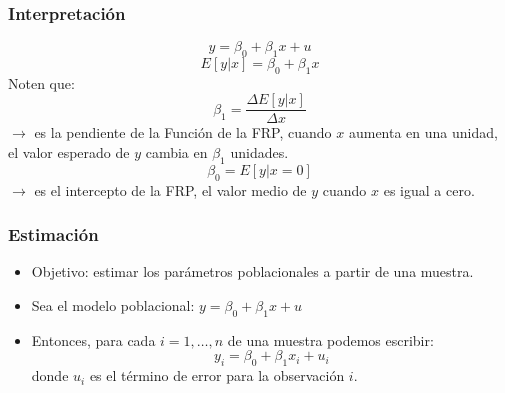 \documentclass{beamer}
\begin{document}
\begin{frame}
	\frametitle{Interpretaci\'on} %
\begin{equation*}
  y = \beta_0 + \beta_1x + u
\end{equation*}
\begin{equation*}
  E[y|x] = \beta_0 + \beta_1x
\end{equation*}
Noten que:
\begin{equation*}
  \beta_1 = \frac{\Delta E[y|x]}{\Delta x}
\end{equation*}
$\rightarrow$ es la pendiente de la Función de la FRP, cuando \(x\) aumenta en una unidad, el valor esperado de \(y\) cambia en \(\beta_1\) unidades.
\begin{equation*}
  \beta_0 = E[y|x = 0]
\end{equation*}
$\rightarrow$ es el intercepto de la FRP, el valor medio de \(y\) cuando \(x\) es igual a cero.
\end{frame}	
\begin{frame}
	\frametitle{Estimaci\'on} %
\begin{itemize}
  \item Objetivo: estimar los parámetros poblacionales a partir de una muestra.
  \item Sea el modelo poblacional: $y = \beta_0 + \beta_1x + u$
  \item Entonces, para cada $i = 1, \ldots, n$ de una muestra podemos escribir:
  \begin{equation*}
    y_i = \beta_0 + \beta_1x_i + u_i
  \end{equation*}
  donde $u_i$ es el término de error para la observación $i$.
\end{itemize}
\end{frame}	
\end{document}
